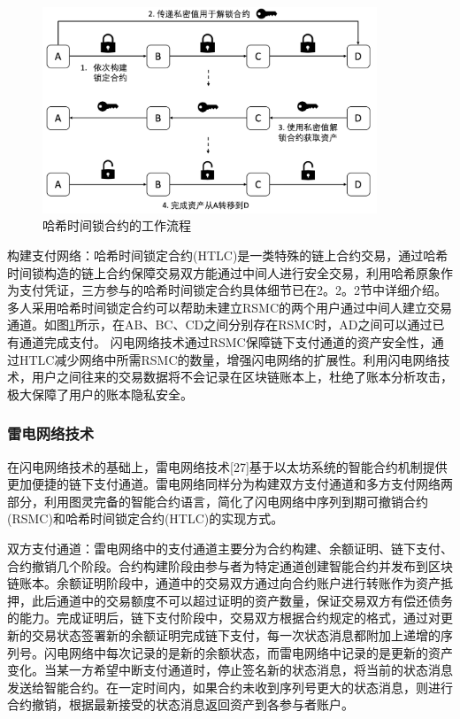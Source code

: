 \begin{figure}
\centering
\includegraphics[width=10cm]{figures/hash-time-lock.png}
\caption{哈希时间锁合约的工作流程}
\label{fig:hash-time-lock}
\end{figure}

构建支付网络：哈希时间锁定合约(HTLC)是一类特殊的链上合约交易，通过哈希时间锁构造的链上合约保障交易双方能通过中间人进行安全交易，利用哈希原象作为支付凭证，三方参与的哈希时间锁定合约具体细节已在2。2。2节中详细介绍。多人采用哈希时间锁定合约可以帮助未建立RSMC的两个用户通过中间人建立交易通道。如图\ref{fig:hash-time-lock}所示，在AB、BC、CD之间分别存在RSMC时，AD之间可以通过已有通道完成支付。
闪电网络技术通过RSMC保障链下支付通道的资产安全性，通过HTLC减少网络中所需RSMC的数量，增强闪电网络的扩展性。利用闪电网络技术，用户之间往来的交易数据将不会记录在区块链账本上，杜绝了账本分析攻击，极大保障了用户的账本隐私安全。

\subsubsection{雷电网络技术}

在闪电网络技术的基础上，雷电网络技术[27]基于以太坊系统的智能合约机制提供更加便捷的链下支付通道。雷电网络同样分为构建双方支付通道和多方支付网络两部分，利用图灵完备的智能合约语言，简化了闪电网络中序列到期可撤销合约(RSMC)和哈希时间锁定合约(HTLC)的实现方式。

双方支付通道：雷电网络中的支付通道主要分为合约构建、余额证明、链下支付、合约撤销几个阶段。合约构建阶段由参与者为特定通道创建智能合约并发布到区块链账本。余额证明阶段中，通道中的交易双方通过向合约账户进行转账作为资产抵押，此后通道中的交易额度不可以超过证明的资产数量，保证交易双方有偿还债务的能力。完成证明后，链下支付阶段中，交易双方根据合约规定的格式，通过对更新的交易状态签署新的余额证明完成链下支付，每一次状态消息都附加上递增的序列号。闪电网络中每次记录的是新的余额状态，而雷电网络中记录的是更新的资产变化。当某一方希望中断支付通道时，停止签名新的状态消息，将当前的状态消息发送给智能合约。在一定时间内，如果合约未收到序列号更大的状态消息，则进行合约撤销，根据最新接受的状态消息返回资产到各参与者账户。

